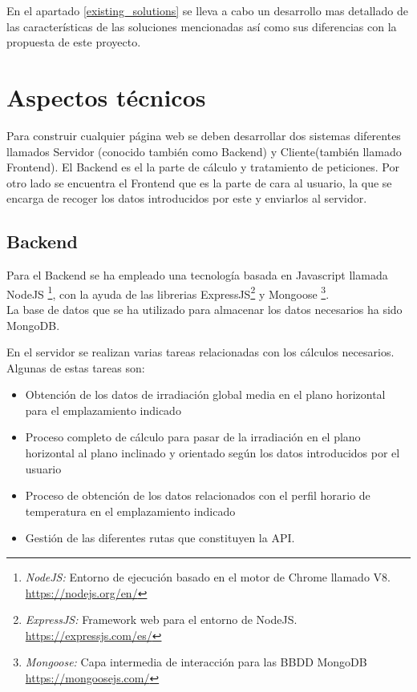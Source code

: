 En el apartado \ref{existing_solutions}  se lleva a cabo un desarrollo mas detallado de las características de las soluciones mencionadas así como sus diferencias con la propuesta de este proyecto.

\section{Aspectos técnicos}

Para construir cualquier página web se deben desarrollar dos sistemas diferentes llamados Servidor (conocido también como Backend) y Cliente(también llamado Frontend).
El Backend es el la parte de cálculo y tratamiento de peticiones. Por otro lado se encuentra el Frontend que es la parte de cara al usuario, la que se encarga de recoger los datos introducidos por este y enviarlos al servidor.

\subsection{Backend}

Para el Backend se ha empleado una tecnología basada en Javascript llamada NodeJS \footnote{\textit{NodeJS:} Entorno de ejecución basado en el motor de Chrome llamado V8. \url{https://nodejs.org/en/} }, con la ayuda de las librerias ExpressJS\footnote{\textit{ExpressJS:} Framework web para el entorno de NodeJS. \url{https://expressjs.com/es/}} y Mongoose \footnote{\textit{Mongoose:} Capa intermedia de interacción para las BBDD MongoDB \url{https://mongoosejs.com/}}.   \\
La base de datos que se ha utilizado para almacenar los datos necesarios ha sido MongoDB.

En el servidor se realizan varias tareas relacionadas con los cálculos necesarios. Algunas de estas tareas son:
\begin{itemize}
\item Obtención de los datos de irradiación global media en el plano horizontal para el emplazamiento indicado
\item Proceso completo de cálculo para pasar de la irradiación en el plano horizontal al plano inclinado y orientado según los datos introducidos por el usuario
\item Proceso de obtención de los datos relacionados con el perfil horario de temperatura en el emplazamiento indicado
\item Gestión de las diferentes rutas que constituyen la API.
\end{itemize}

